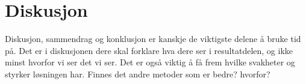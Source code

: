\section{Diskusjon}

Diskusjon, sammendrag og konklusjon er kanskje de viktigste delene å bruke tid på.
Det er i diskusjonen dere skal forklare hva dere ser i resultatdelen, og ikke minst hvorfor vi ser det vi ser.
Det er også viktig å få frem hvilke svakheter og styrker løsningen har. Finnes det andre metoder som er bedre? hvorfor?